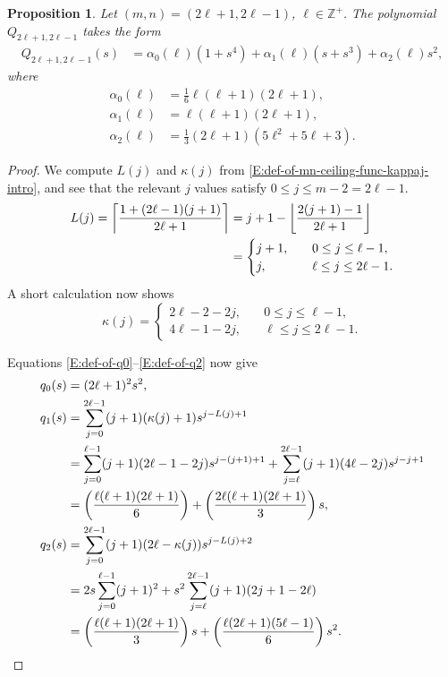 \documentclass[letterpaper,11pt,reqno]{amsart}
\theoremstyle{plain}
\newtheorem{proposition}[equation]{Proposition}
\theoremstyle{definition}
\theoremstyle{remark}
\theoremstyle{remark}
\numberwithin{equation}{section}
\newcommand{\Z}{{\mathbb Z}}
\begin{document}
\begin{proposition}\label{P:k=2-form-of-poly}
Let $(m,n) = (2\ell+1, 2\ell-1)$, $\ell \in \Z^+$. 
The polynomial $Q_{2\ell+1,2\ell-1}$ takes the form
\begin{align*}
Q_{2\ell+1,2\ell-1}(s) &= \alpha_0(\ell) (1+ s^4) + \alpha_1(\ell) (s+s^3) + \alpha_2(\ell) s^2,
\end{align*}
where
\begin{align*}
\alpha_0(\ell) &= \tfrac{1}{6}\ell(\ell+1)(2\ell+1), \\
\alpha_1(\ell) &= \ell(\ell+1)(2\ell+1),\\
\alpha_2(\ell) &= \tfrac{1}{3}(2\ell+1)(5\ell^2+5\ell+3).
\end{align*}
\end{proposition}
\begin{proof}
We compute $L(j)$ and $\kappa(j)$ from \eqref{E:def-of-mn-ceiling-func-kappaj-intro}, and see that the relevant $j$ values satisfy $0 \le j \le m-2 = 2\ell - 1$.
\begin{align}
L(j) 
= \left\lceil \frac{1+(2\ell-1)(j+1)}{2\ell+1} \right\rceil
&= j+1 - \left\lfloor \frac{2(j+1)-1}{2\ell+1} \right\rfloor \notag \\
&=
\begin{cases} 
j + 1, & \quad  0 \le j \le \ell - 1,  \\ 
j, &  \quad \ell \le j \le 2\ell - 1.
\end{cases} \label{E:L(j)_k=2}
\end{align}
A short calculation now shows
\begin{equation}\label{E:kappa(j)_k=2}
\kappa(j) =
\begin{cases} 
2\ell - 2 - 2j, & \quad  0 \le j \le \ell - 1,  \\ 
4\ell - 1 - 2j, &  \quad \ell \le j \le 2\ell - 1.
\end{cases} 
\end{equation}

Equations \eqref{E:def-of-q0}--\eqref{E:def-of-q2} now give
{
\allowdisplaybreaks
\begin{align}
q_0(s) 
&= (2\ell+1)^2 s^2, \\
q_1(s)
&= \sum_{j=0}^{2\ell-1} (j+1)(\kappa(j)+1) s^{j-L(j)+1} \notag \\
&= \sum_{j=0}^{\ell-1} (j+1)(2\ell-1-2j) s^{j - (j+1) + 1} + \sum_{j=\ell}^{2\ell-1} (j+1)(4\ell-2j) s^{j - j + 1} \notag \\
&= \left( \frac{\ell(\ell+1)(2\ell+1)}{6} \right) + \left(\frac{2 \ell(\ell+1)(2\ell+1)}{3} \right) s, \label{E:q1_k=2} \\
q_2(s) 
&= \sum_{j=0}^{2\ell-1} (j+1)(2\ell -\kappa(j)) s^{j-L(j)+2} \notag \\
&= 2s \sum_{j=0}^{\ell-1} (j+1)^2 + s^2 \sum_{j=\ell}^{2\ell-1} (j+1)(2j+1-2\ell) \notag \\
&= \left(\frac{\ell(\ell+1)(2\ell+1)}{3}\right) s + \left( \frac{\ell(2\ell+1)(5\ell-1)}{6} \right) s^2. \notag
\end{align}
}


\end{proof}
\end{document}
